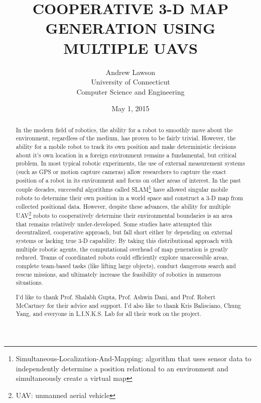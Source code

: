 \documentclass[letterpaper, oneside, 10pt]{report}
\title{\large COOPERATIVE 3-D MAP GENERATION USING MULTIPLE UAVS}
\author{
  \large
  Andrew Lawson \\
  University of Connecticut \\
  Computer Science and Engineering
}
\date{\large May 1, 2015}
\begin{document}
\doublespacing

\begin{titlepage}
  \maketitle
  \thispagestyle{empty}
\end{titlepage}
\clearpage

\begin{abstract}
  In the modern field of robotics, the ability for a robot to smoothly move about the environment, regardless of the medium, has proven to be fairly trivial. However, the ability for a mobile robot to track its own position and make deterministic decisions about it's own location in a foreign environment remains a fundamental, but critical problem. In most typical robotic experiments, the use of external measurement systems (such as GPS or motion capture cameras) allow researchers to capture the exact position of a robot in its environment and focus on other areas of interest. In the past couple decades, successful algorithms called SLAM\footnote{Simultaneous-Localization-And-Mapping: algorithm that uses sensor data to independently determine a position relational to an environment and simultaneously create a virtual map} have allowed singular mobile robots to determine their own position in a world space and construct a 3-D map from collected positional data. However, despite these advances, the ability for multiple UAV\footnote{UAV: unmanned aerial vehicle} robots to cooperatively determine their environmental boundaries is an area that remains relatively under-developed. Some studies have attempted this decentralized, cooperative approach, but fall short either by depending on external systems or lacking true 3-D capability. By taking this distributional approach with multiple robotic agents, the computational overhead of map generation is greatly reduced. Teams of coordinated robots could efficiently explore unaccessible areas, complete team-based tasks (like lifting large objects), conduct dangerous search and rescue missions, and ultimately increase the feasibility of robotics in numerous situations.
\end{abstract}
\clearpage

\renewcommand{\abstractname}{Acknowledgements}
\begin{abstract}
 I'd like to thank Prof. Shalabh Gupta, Prof. Ashwin Dani, and Prof. Robert McCartney for their advice and support. I'd also like to thank Kris Balisciano, Chung Yang, and everyone in L.I.N.K.S. Lab for all their work on the project.
\end{abstract}
\clearpage
\end{document}
